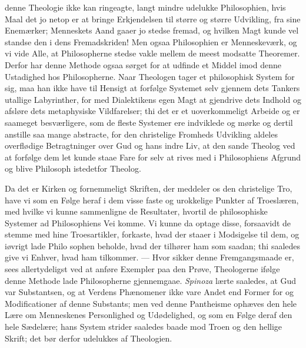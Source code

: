 \documentclass[12pt]{book}
\newcommand{\opage}[1]{\marginnote{\footnotesize\textit{[#1]}}}
\begin{document}
\opage{103} denne Theologie ikke kan ringeagte, langt mindre udelukke Philosophien, hvis
Maal det jo netop er at bringe Erkjendelsen til større og større Udvikling,
fra sine Enemærker; Menneskets Aand gaaer jo stedse fremad, og hvilken Magt
kunde vel standse den i dens Fremadskriden! Men ogsaa Philosophien er
Menneskeværk, og vi vide Alle, at Philosopherne stedse vakle mellem de meest
modsatte Theoremer. Derfor har denne Methode ogsaa sørget for at udfinde et
Middel imod denne Ustadighed hos Philosopherne. Naar Theologen tager et
philosophisk System for sig, maa han ikke have til Hensigt at forfølge
Systemet selv gjennem dets Tankers utallige Labyrinther, for med Dialektikens
egen Magt at gjendrive dets Indhold og afsløre dets metaphysiske
Vildfarelser; thi det er et uoverkommeligt Arbeide og er saameget
besværligere, som de fleste Systemer ere indviklede og mørke og dertil
anstille saa mange abstracte, for den christelige Fromheds Udvikling aldeles
overflødige Betragtninger over Gud og hans indre Liv, at den sande Theolog ved
at forfølge dem let kunde staae Fare for selv at rives med i Philosophiens
Afgrund og blive Philosoph istedetfor Theolog.

Da det er Kirken og fornemmeligt Skriften, der meddeler os den christelige
Tro, have vi som en Følge heraf i dem visse faste og urokkelige Punkter af
Troeslæren, med hvilke vi kunne sammenligne de Resultater, hvortil de
philosophiske Systemer ad Philosophiens Vei komme. Vi kunne da optage disse,
forsaavidt de stemme med hine Troesartikler, forkaste, hvad der staaer i
Modsigelse til dem, og iøvrigt lade Philo\-%
\opage{104}sophen beholde, hvad der tilhører ham som saadan; thi saaledes give vi
Enhver, hvad ham tilkommer. --- Hvor sikker denne Fremgangsmaade er, sees
allertydeligst ved at anføre Exempler paa den Prøve, Theologerne ifølge denne
Methode lade Philosopherne gjennemgaae. \emph{Spinoza} lærte saaledes, at Gud
var Substantsen, og at Verdens Phænomener ikke vare Andet end Former for og
Modificationer af denne Substants; men ved denne Pantheisme ophæves den hele
Lære om Menneskenes Personlighed og Udødelighed, og som en Følge deraf den
hele Sædelære; hans System strider saaledes baade mod Troen og den hellige
Skrift; det bør derfor udelukkes af Theologien.
\end{document}
